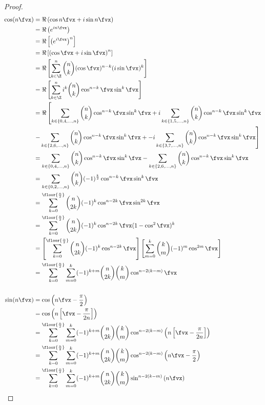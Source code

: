 \begin{proof}
\begin{align*}
  \cos(n\fvx)
    &= \Re\left(\cos n\fvx + i\sin n\fvx \right)
  \\&= \Re\left( e^{in\fvx}\right)
  \\&= \Re\left[\left( e^{i\fvx}\right)^n\right]
  \\&= \Re\left[\left( \cos\fvx + i\sin\fvx \right)^n\right]
  \\&= \Re\left[\sum_{k\in\Z}^n \binom{n}{k}(\cos\fvx)^{n-k} (i\sin\fvx)^k\right]
  \\&= \Re\left[\sum_{k\in\Z}^n i^k \binom{n}{k}\cos^{n-k}\fvx \sin^k\fvx \right]
  \\&= \Re\left[  \sum_{k\in\{0,4,\ldots,n\}} \binom{n}{k} \cos^{n-k}\fvx \sin^k\fvx +
        i\sum_{k\in\{1,5,\ldots,n\}} \binom{n}{k} \cos^{n-k}\fvx \sin^k\fvx  \right.
       \\& \left.
        -\sum_{k\in\{2,6,\ldots,n\}} \binom{n}{k} \cos^{n-k}\fvx \sin^k\fvx +
       -i\sum_{k\in\{3,7,\ldots,n\}} \binom{n}{k} \cos^{n-k}\fvx \sin^k\fvx \right]
  \\&= \sum_{k\in\{0,4,\ldots,n\}} \binom{n}{k} \cos^{n-k}\fvx \sin^k\fvx 
        -\sum_{k\in\{2,6,\ldots,n\}} \binom{n}{k} \cos^{n-k}\fvx \sin^k\fvx 
  \\&=   \sum_{k\in\{0,2,\ldots,n\}} \binom{n}{k}(-1)^{\frac{k  }{2}} \cos^{n-k}\fvx \sin^k\fvx 
  \\&=   \sum_{k=0}^\floor{\frac{n}{2}}     \binom{n}{2k}(-1)^k   \cos^{n-2k  }\fvx \sin^{2k  }\fvx 
  \\&=   \sum_{k=0}^\floor{\frac{n}{2}}     \binom{n}{2k}(-1)^k   \cos^{n-2k  }\fvx (1-\cos^2\fvx)^k 
  \\&=   \left[\sum_{k=0}^\floor{\frac{n}{2}}     \binom{n}{2k}(-1)^k   \cos^{n-2k  }\fvx \right]
         \left[\sum_{m=0}^k \binom{k}{m}(-1)^m\cos^{2m}\fvx \right] 
  \\&=   \sum_{k=0}^\floor{\frac{n}{2}}\sum_{m=0}^k      
         (-1)^{k+m}\binom{n}{2k}\binom{k}{m}   \cos^{n-2(k-m)}\fvx 
  \\
  \\
  \sin(n\fvx)
    &= \cos\left(n\fvx-\frac{\pi}{2}\right)
  \\&= \cos\left(n\left[\fvx-\frac{\pi}{2n}\right]\right)
  \\&= \sum_{k=0}^\floor{\frac{n}{2}}\sum_{m=0}^k      
       (-1)^{k+m}\binom{n}{2k}\binom{k}{m} \cos^{n-2(k-m)}\left(n\left[\fvx-\frac{\pi}{2n}\right]\right)
  \\&= \sum_{k=0}^\floor{\frac{n}{2}}\sum_{m=0}^k
       (-1)^{k+m}\binom{n}{2k}\binom{k}{m} \cos^{n-2(k-m)}\left(n\fvx-\frac{\pi}{2}\right)
  \\&= \sum_{k=0}^\floor{\frac{n}{2}}\sum_{m=0}^k
       (-1)^{k+m}\binom{n}{2k}\binom{k}{m} \sin^{n-2(k-m)}\left(n\fvx\right)
\end{align*}
\end{proof}

